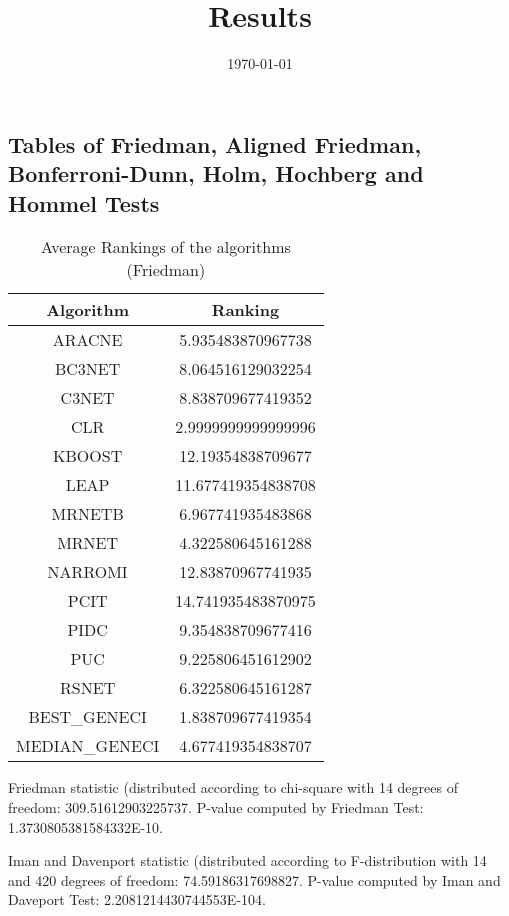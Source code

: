 \documentclass[a4paper,10pt]{article}
\title{Results}
\author{}
\date{\today}
\begin{document}
\begin{landscape}
\oddsidemargin 0in \topmargin 0in\maketitle
\section{Tables of Friedman, Aligned Friedman, Bonferroni-Dunn, Holm, Hochberg and Hommel Tests}
\begin{table}[!htp]
\centering
\caption{Average Rankings of the algorithms (Friedman)
}\begin{tabular}{c|c}
Algorithm&Ranking\\
\hline
ARACNE&5.935483870967738\\
BC3NET&8.064516129032254\\
C3NET&8.838709677419352\\
CLR&2.9999999999999996\\
KBOOST&12.19354838709677\\
LEAP&11.677419354838708\\
MRNETB&6.967741935483868\\
MRNET&4.322580645161288\\
NARROMI&12.83870967741935\\
PCIT&14.741935483870975\\
PIDC&9.354838709677416\\
PUC&9.225806451612902\\
RSNET&6.322580645161287\\
BEST_GENECI&1.838709677419354\\
MEDIAN_GENECI&4.677419354838707\\
\end{tabular}
\end{table}


Friedman statistic (distributed according to chi-square with 14 degrees of freedom: 309.51612903225737. 
P-value computed by Friedman Test: 1.3730805381584332E-10.\newline

Iman and Davenport statistic (distributed according to F-distribution with 14 and 420 degrees of freedom: 74.59186317698827. 
P-value computed by Iman and Daveport Test: 2.2081214430744553E-104.\newline


\newpage


\end{landscape}
\end{document}
